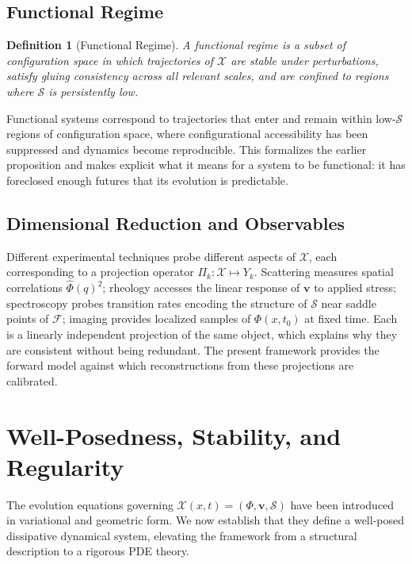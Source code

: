\documentclass[11pt, a4paper, twocolumn]{article}
\newtheorem{definition}{Definition}[section]
\newcommand{\X}{\mathcal{X}}
\newcommand{\Sfield}{\mathcal{S}}
\newcommand{\F}{\mathcal{F}}
\begin{document}
\subsection{Functional Regime}

\begin{definition}[Functional Regime]
A functional regime is a subset of configuration space in which trajectories
of $\X$ are stable under perturbations, satisfy gluing consistency across all
relevant scales, and are confined to regions where $\Sfield$ is persistently
low.
\end{definition}

Functional systems correspond to trajectories that enter and remain within
low-$\Sfield$ regions of configuration space, where configurational accessibility
has been suppressed and dynamics become reproducible. This formalizes the
earlier proposition and makes explicit what it means for a system to be
functional: it has foreclosed enough futures that its evolution is predictable.

\subsection{Dimensional Reduction and Observables}

Different experimental techniques probe different aspects of $\X$, each
corresponding to a projection operator $\Pi_k : \X \mapsto Y_k$. Scattering
measures spatial correlations $\hat{\Phi}(q)^2$; rheology accesses the linear
response of $\mathbf{v}$ to applied stress; spectroscopy probes transition rates
encoding the structure of $\Sfield$ near saddle points of $\F$; imaging provides
localized samples of $\Phi(x,t_0)$ at fixed time. Each is a linearly independent
projection of the same object, which explains why they are consistent without
being redundant. The present framework provides the forward model against which
reconstructions from these projections are calibrated.

\section{Well-Posedness, Stability, and Regularity}

The evolution equations governing $\X(x,t) = (\Phi,\mathbf{v},\Sfield)$ have
been introduced in variational and geometric form. We now establish that they
define a well-posed dissipative dynamical system, elevating the framework from
a structural description to a rigorous PDE theory.
\end{document}
